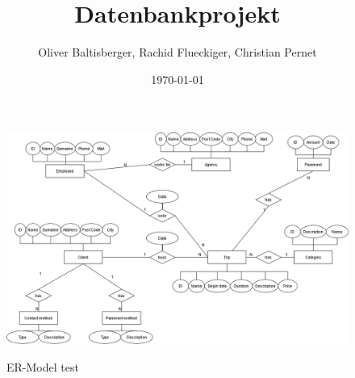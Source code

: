 \documentclass{article}
\title{Datenbankprojekt}
\author{Oliver Baltisberger, Rachid Flueckiger, Christian Pernet}
\date{\today}
\begin{document}
	\maketitle
	
	\begin{figure}[htbp]
		\centering
			\includegraphics[width=1.00\textwidth]{../DB Projekt 1-ER-Model.png}
		\label{ER-Model}
		\caption{ER-Model test}
	\end{figure}
	
\end{document}

